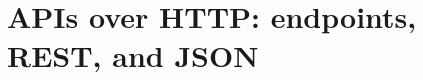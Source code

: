 \chapter{APIs over HTTP: endpoints, REST, and JSON}
\label{ch:apis-over-http-endpoints-rest-and-json}

